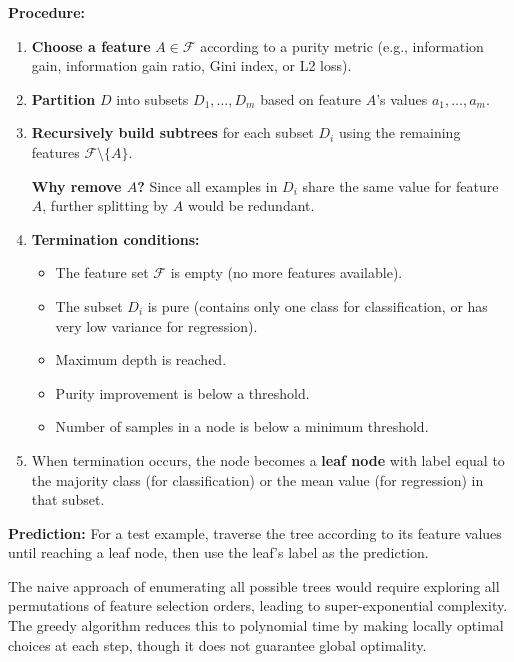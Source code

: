 \documentclass[../main]{subfiles}
\begin{document}
    \textbf{Procedure:}
    \begin{enumerate}
        \item \textbf{Choose a feature} $A \in \mathcal{F}$ according to a purity metric (e.g., information gain, information gain ratio, Gini index, or L2 loss).
        \item \textbf{Partition} $D$ into subsets $D_1,\ldots,D_m$ based on feature $A$'s values $a_1,\ldots,a_m$.
        \item \textbf{Recursively build subtrees} for each subset $D_i$ using the remaining features $\mathcal{F} \setminus \{A\}$.
        
        \textbf{Why remove $A$?} Since all examples in $D_i$ share the same value for feature $A$, further splitting by $A$ would be redundant.
        
        \item \textbf{Termination conditions:}
        \begin{itemize}
            \item The feature set $\mathcal{F}$ is empty (no more features available).
            \item The subset $D_i$ is pure (contains only one class for classification, or has very low variance for regression).
            \item Maximum depth is reached.
            \item Purity improvement is below a threshold.
            \item Number of samples in a node is below a minimum threshold.
        \end{itemize}
        \item When termination occurs, the node becomes a \textbf{leaf node} with label equal to the majority class (for classification) or the mean value (for regression) in that subset.
    \end{enumerate}
    
    \textbf{Prediction:} For a test example, traverse the tree according to its feature values until reaching a leaf node, then use the leaf's label as the prediction.


\begin{remark}
    The naive approach of enumerating all possible trees would require exploring all permutations of feature selection orders, leading to super-exponential complexity.  The greedy algorithm reduces this to polynomial time by making locally optimal choices at each step, though it does not guarantee global optimality.
\end{remark}
\end{document}
